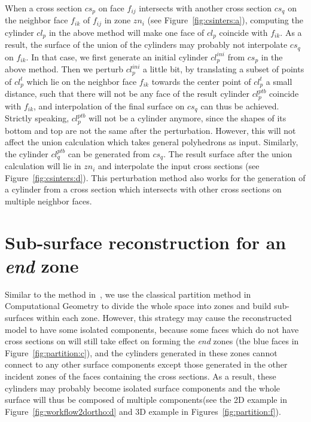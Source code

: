 When a cross section $cs_p$ on face $f_{ij}$  intersects with
another cross section $cs_q$ on the neighbor face $f_{ik}$ of
$f_{ij}$ in zone $zn_i$ (see Figure~\ref{fig:csinters:a}), computing
the cylinder $cl_p$ in the above method will make one face of $cl_p$
coincide with $f_{ik}$. As a result, the surface of the union of the
cylinders may probably not interpolate $cs_q$ on $f_{ik}$. In that
case, we first generate an initial cylinder $cl_p^{ini}$ from $cs_p$
in the above method. Then we perturb $cl_p^{ini}$ a little bit, by
translating a subset of points of $cl_p^t$ which lie on the neighbor
face $f_{ik}$ towards the center point of $cl_p^t$ a small distance,
such that there will not be any face of the result cylinder
$cl_p^{ptb}$ coincide with $f_{ik}$, and interpolation of the final
surface on $cs_q$ can thus be achieved. Strictly speaking,
$cl_p^{ptb}$ will not be a cylinder anymore, since the shapes of its
bottom and top are not the same after the perturbation. However,
this will not affect the union calculation which takes general
polyhedrons as input. Similarly, the cylinder $cl_q^{ptb}$ can be
generated from $cs_q$. The result surface after the union
calculation will lie in $zn_i$ and interpolate the input cross
sections (see Figure~\ref{fig:csinters:d}). This perturbation method
also works for the generation of a cylinder from a cross section
which intersects with other cross sections on multiple neighbor
faces.

\section{Sub-surface reconstruction for an \textit{end} zone}
\label{ch4:sec:algo:end}

Similar to the method in~\cite{LBDLJ08}, we use  the classical
partition method in Computational Geometry to divide the whole space
into zones and build sub-surfaces within each zone. However, this
strategy may cause the reconstructed model to have some isolated
components, because some faces which do not have cross sections on
will still take effect on forming the \textit{end} zones (the blue
faces in Figure~\ref{fig:partition:c}), and the cylinders generated
in these zones cannot connect to any other surface components except
those generated in the other incident zones of the faces containing
the cross sections. As a result, these cylinders may probably become
isolated surface components and the whole surface will thus be
composed of multiple components(see the 2D example in
Figure~\ref{fig:workflow2dortho:d} and 3D example in
Figures~\ref{fig:partition:f}).

